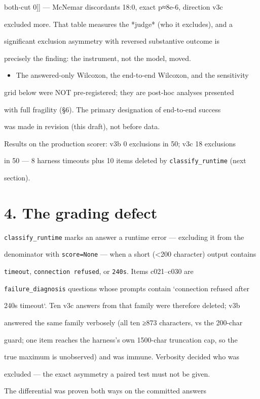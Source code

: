 \documentclass[11pt,a4paper]{article}
\begin{document}
both-cut 0]] — McNemar discordants 18:0, exact p≈8e-6, direction v3c

excluded more. That table measures the *judge* (who it excludes), and a

significant exclusion asymmetry with reversed substantive outcome is

precisely the finding: the instrument, not the model, moved.

\begin{itemize}
\item The answered-only Wilcoxon, the end-to-end Wilcoxon, and the sensitivity
\end{itemize}
grid below were NOT pre-registered; they are post-hoc analyses presented

with full fragility (§6). The primary designation of end-to-end success

was made in revision (this draft), not before data.

Results on the production scorer: v3b 0 exclusions in 50; v3c 18 exclusions

in 50 — 8 harness timeouts plus 10 items deleted by \texttt{classify\_runtime} (next

section).

\section*{4. The grading defect}
\texttt{classify\_runtime} marks an answer a runtime error — excluding it from the

denominator with \texttt{score=None} — when a short (<200 character) output contains

\texttt{timeout}, \texttt{connection refused}, or \texttt{240s}. Items c021–c030 are

\texttt{failure\_diagnosis} questions whose prompts contain `connection refused after

240s timeout`. Ten v3c answers from that family were therefore deleted; v3b

answered the same family verbosely (all ten ≥873 characters, vs the 200-char

guard; one item reaches the harness's own 1500-char truncation cap, so the

true maximum is unobserved) and was immune. Verbosity decided who was

excluded — the exact asymmetry a paired test must not be given.

The differential was proven both ways on the committed answers
\end{document}
